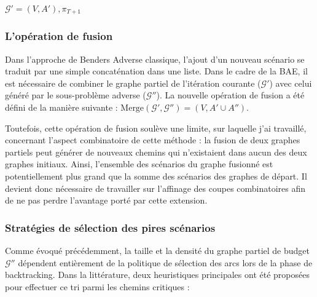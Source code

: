 \documentclass[12pt, a4paper, twoside]{report}
\numberwithin{equation}{section}
\begin{document}
\begin{Figure}[H]
\begin{algorithm}[H]
\begin{algorithmic}[1]
			\State \Return $\mathcal{G}'=(V, A'), \pi_{T+1}$
		\end{algorithmic}
	\end{algorithm}
	
	\subsubsection{L'opération de fusion}
	
	Dans l'approche de Benders Adverse classique, l'ajout d'un nouveau scénario se traduit par une simple concaténation dans une liste. Dans le cadre de la BAE, il est nécessaire de combiner le graphe partiel de l'itération courante ($\mathcal{G}'$) avec celui généré par le sous-problème adverse ($\mathcal{G}''$). La nouvelle opération de fusion a été défini de la manière suivante : $\text{Merge}(\mathcal{G}', \mathcal{G}'')=(V, A'\cup A'')$.
	
	Toutefois, cette opération de fusion soulève une limite, sur laquelle j'ai travaillé, concernant l'aspect combinatoire de cette méthode \cite{portoleauTHESIS} : la fusion de deux graphes partiels peut générer de nouveaux chemins qui n'existaient dans aucun des deux graphes initiaux. Ainsi, l'ensemble des scénarios du graphe fusionné est potentiellement plus grand que la somme des scénarios des graphes de départ. Il devient donc nécessaire de travailler sur l'affinage des coupes combinatoires afin de ne pas perdre l'avantage porté par cette extension.
	
	\subsubsection{Stratégies de sélection des pires scénarios}
	
	Comme évoqué précédemment, la taille et la densité du graphe partiel de budget $\mathcal{G}''$ dépendent entièrement de la politique de sélection des arcs lors de la phase de backtracking. Dans la littérature, deux heuristiques principales ont été proposées pour effectuer ce tri parmi les chemins critiques \cite{portoleauTHESIS} :
	

\end{Figure}
\end{document}
